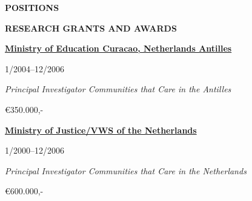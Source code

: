 \documentclass[
  16,
]{article}
\begin{document}
\begin{large}{\bf POSITIONS}
\begin{large}{\bf RESEARCH GRANTS AND AWARDS}
\vspace{7pt}


\begin{multicols}{2}
    \begin{flushleft}{\bf \href{https://www.dnb.com/business-directory/company-profiles.ministerie_van_onderwijs_wetenschap_cultuur__sport.0725f84f9bab30462628b87a4d92c3de.html}{Ministry of Education Curacao, Netherlands Antilles}}\end{flushleft}
    \begin{flushright}1/2004–12/2006\end{flushright}
  \end{multicols}
  \vspace{-0.17cm}
  \begin{multicols}{2}
    \begin{flushleft}\textit{Principal Investigator Communities that Care in the Antilles}\end
    {flushleft}
    \begin{flushright}€350.000,-  \end
    {flushright}
  \end{multicols}

\vspace{7pt}


\begin{multicols}{2}
    \begin{flushleft}{\bf \href{https://www.rijksoverheid.nl/ministeries/ministerie-van-justitie-en-veiligheid}{Ministry of Justice/VWS of the Netherlands}}\end{flushleft}
    \begin{flushright}1/2000–12/2006\end{flushright}
  \end{multicols}
  \vspace{-0.17cm}
  \begin{multicols}{2}
    \begin{flushleft}\textit{Principal Investigator Communities that Care in the Netherlands}\end
    {flushleft}
    \begin{flushright}€600.000,-  \end
    {flushright}
  \end{multicols}

\vspace{7pt}



\end{large}
\end{large}
\end{document}
